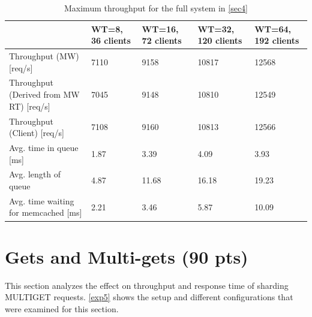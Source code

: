 \documentclass[11pt,a4paper]{article}
\begin{document}
\begin{center}
\begin{table}[H]
	\begin{tabular}{|l|p{1.7cm}|p{1.7cm}|p{1.75cm}|p{1.75cm}|}
		\hline                                              & WT=8, 36 clients & WT=16, 72 clients    & WT=32, 120 clients    & WT=64, 192 clients   \\ 
		\hline Throughput (MW) [req/s]                      & 7110              & 9158                & 10817                 & 12568                 \\ 
		\hline Throughput (Derived from MW RT) [req/s]      & 7045              & 9148                & 10810                 & 12549         \\
		\hline Throughput (Client) [req/s]                  & 7108              & 9160                & 10813                 & 12566                 \\ 
		\hline Avg. time in queue [ms]                      & 1.87            & 3.39              & 4.09                & 3.93                  \\ 
		\hline Avg. length of queue                         & 4.87              & 11.68               & 16.18                 & 19.23                 \\ 
		\hline Avg. time waiting for memcached [ms]         & 2.21            & 3.46                & 5.87                & 10.09                 \\ 
		\hline 
	\end{tabular}
	\caption{Maximum throughput for the full system in \autoref{sec4}} 
	\label{res4}
\end{table}
\end{center}

\section{Gets and Multi-gets (90 pts)}
This section analyzes the effect on throughput and response time of sharding MULTIGET requests. \autoref{exp5} shows the setup and different configurations that were examined for this section.
\end{document}
